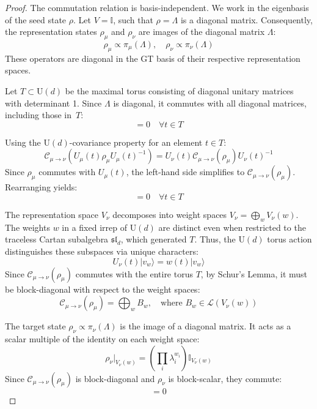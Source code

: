 \documentclass[11pt,letterpaper]{article}
\newcommand{\ket}[1]{| #1 \rangle}
\def\C{\mathcal{C}}
\begin{document}
\begin{proof}
The commutation relation is basis-independent. We work in the eigenbasis of the seed state $\rho$. Let $V = \mathbb{I}$, such that $\rho = \Lambda$ is a diagonal matrix. Consequently, the representation states $\rho_\mu$ and $\rho_\nu$ are images of the diagonal matrix $\Lambda$:
\begin{equation}
    \rho_\mu \propto \pi_\mu(\Lambda), \quad \rho_\nu \propto \pi_\nu(\Lambda)
\end{equation}
These operators are diagonal in the GT basis of their respective representation spaces. 

Let $T \subset \text{U}(d)$ be the maximal torus consisting of diagonal unitary matrices with determinant 1. Since $\Lambda$ is diagonal, it commutes with all diagonal matrices, including those in~$T$:
\begin{equation}
    [\rho_\mu, U_\mu(t)] = 0 \quad \forall t \in T
\end{equation}

Using the $\text{U}(d)$-covariance property for an element $t \in T$:
\begin{equation}
    \C_{\mu\to\nu}( U_\mu(t) \rho_\mu U_\mu(t)^{-1} ) = U_\nu(t) \C_{\mu\to\nu}(\rho_\mu) U_\nu(t)^{-1}
\end{equation}
Since $\rho_\mu$ commutes with $U_\mu(t)$, the left-hand side simplifies to $\C_{\mu\to\nu}(\rho_\mu)$. Rearranging yields:
\begin{equation}
    [\C_{\mu\to\nu}(\rho_\mu), U_\nu(t)] = 0 \quad \forall t \in T
\end{equation}

The representation space $V_\nu$ decomposes into weight spaces $V_\nu = \bigoplus_{w} V_\nu(w)$.  The weights $w$ in a fixed irrep of $\text{U}(d)$ are distinct even when restricted to the traceless Cartan subalgebra $\mathfrak{sl}_d$, which generated $T$. Thus, the $\text{U}(d)$ torus action distinguishes these subspaces via unique characters:
\begin{equation}
    U_\nu(t) \ket{v_w} = w(t) \ket{v_w}
\end{equation}
Since $\C_{\mu\to\nu}(\rho_\mu)$ commutes with the entire torus $T$, by Schur's Lemma, it must be block-diagonal with respect to the weight spaces:
\begin{equation}
    \C_{\mu\to\nu}(\rho_\mu) = \bigoplus_{w} B_w, \quad \text{where } B_w \in \mathcal{L}(V_\nu(w))
\end{equation}

The target state $\rho_\nu \propto \pi_\nu(\Lambda)$ is the image of a diagonal matrix. It acts as a scalar multiple of the identity on each weight space:
\begin{equation}
    \rho_\nu |_{V_\nu(w)} = (\textstyle\prod_i \lambda_i^{w_i}) \mathbb{I}_{V_\nu(w)}
\end{equation}
Since $\C_{\mu\to\nu}(\rho_\mu)$ is block-diagonal and $\rho_\nu$ is block-scalar, they commute:
\begin{equation}
    [\C_{\mu\to\nu}(\rho_\mu), \rho_\nu] = 0
\end{equation}
\end{proof}
\end{document}
